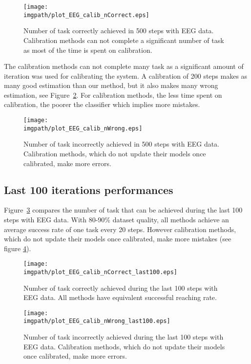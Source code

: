 \begin{figure}[!ht]
\centering
\texttt{[image: \\imgpath/plot\_EEG\_calib\_nCorrect.eps]}
\caption{Number of task correctly achieved in 500 steps with EEG data. Calibration methods can not complete a significant number of task as most of the time is spent on calibration.}
\label{fig:nCorrectEEG}
\end{figure} 

The calibration methods can not complete many task as a significant amount of iteration was used for calibrating the system. A calibration of 200 steps makes as many good estimation than our method, but it also makes many wrong estimation, see Figure~\ref{fig:nWrongEEG}. For calibration methods, the less time spent on calibration, the poorer the classifier which implies more mistakes.

\begin{figure}[!ht]
\centering
\texttt{[image: \\imgpath/plot\_EEG\_calib\_nWrong.eps]}
\caption{Number of task incorrectly achieved in 500 steps with EEG data. Calibration methods, which do not update their models once calibrated, make more errors.}
\label{fig:nWrongEEG}
\end{figure}

\subsection{Last 100 iterations performances}

Figure~\ref{fig:nCorrectEEG_last100} compares the number of task that can be achieved during the last 100 steps with EEG data. With 80-90\% dataset quality, all methods achieve an average success rate of one task every 20 steps. However calibration methods, which do not update their models once calibrated, make more mistakes (see figure \ref{fig:nWrongEEG_last100}).

\begin{figure}[!ht]
\centering
\texttt{[image: \\imgpath/plot\_EEG\_calib\_nCorrect\_last100.eps]}
\caption{Number of task correctly achieved during the last 100 steps with EEG data. All methods have equivalent successful reaching rate.}
\label{fig:nCorrectEEG_last100}
\end{figure} 

\begin{figure}[!ht]
\centering
\texttt{[image: \\imgpath/plot\_EEG\_calib\_nWrong\_last100.eps]}
\caption{Number of task incorrectly achieved during the last 100 steps with EEG data. Calibration methods, which do not update their models once calibrated, make more errors.}
\label{fig:nWrongEEG_last100}
\end{figure} 

